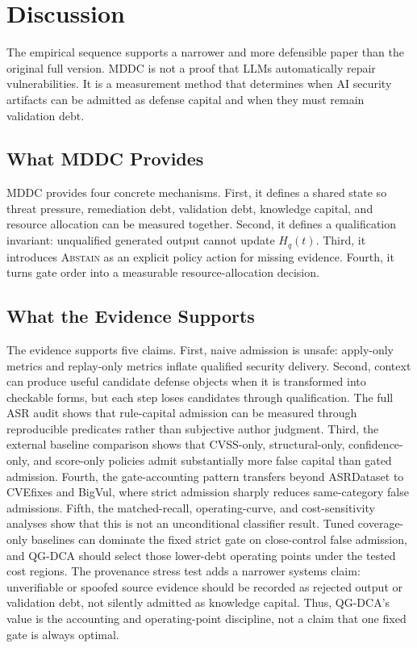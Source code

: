 ﻿\documentclass[lettersize,journal]{IEEEtran}
\begin{document}
\section{Discussion}
The empirical sequence supports a narrower and more defensible paper than the original full version. MDDC is not a proof that LLMs automatically repair vulnerabilities. It is a measurement method that determines when AI security artifacts can be admitted as defense capital and when they must remain validation debt.

\subsection{What MDDC Provides}
MDDC provides four concrete mechanisms. First, it defines a shared state so threat pressure, remediation debt, validation debt, knowledge capital, and resource allocation can be measured together. Second, it defines a qualification invariant: unqualified generated output cannot update $H_q(t)$. Third, it introduces \textsc{Abstain} as an explicit policy action for missing evidence. Fourth, it turns gate order into a measurable resource-allocation decision.

\subsection{What the Evidence Supports}
The evidence supports five claims. First, naive admission is unsafe: apply-only metrics and replay-only metrics inflate qualified security delivery. Second, context can produce useful candidate defense objects when it is transformed into checkable forms, but each step loses candidates through qualification. The full ASR audit shows that rule-capital admission can be measured through reproducible predicates rather than subjective author judgment. Third, the external baseline comparison shows that CVSS-only, structural-only, confidence-only, and score-only policies admit substantially more false capital than gated admission. Fourth, the gate-accounting pattern transfers beyond ASRDataset to CVEfixes and BigVul, where strict admission sharply reduces same-category false admissions. Fifth, the matched-recall, operating-curve, and cost-sensitivity analyses show that this is not an unconditional classifier result. Tuned coverage-only baselines can dominate the fixed strict gate on close-control false admission, and QG-DCA should select those lower-debt operating points under the tested cost regions. The provenance stress test adds a narrower systems claim: unverifiable or spoofed source evidence should be recorded as rejected output or validation debt, not silently admitted as knowledge capital. Thus, QG-DCA's value is the accounting and operating-point discipline, not a claim that one fixed gate is always optimal.
\end{document}
